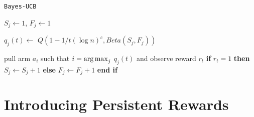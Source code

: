 \begin{algorithm}[H]
	\caption{\texttt{Bayes-UCB}}
	\begin{scriptsize}
		\begin{algorithmic}[1]						
			 
			\State $S_j \gets 1 $, $F_j \gets 1 $
			\EndFor
			 
			
			\State  $q_j(t) \gets$  $Q(1-{1}/{t(\log n)^c},Beta(S_j,F_j))$
			
			\EndFor
			\State pull arm $a_i$ such that  $i = \operatorname*{arg\,max}_j$ $q_j(t) $ and observe reward ${r_t}$	
			\State 	\textbf{if} $r_t=1$  \textbf{then} $S_j \gets S_j + 1$ \textbf{else}  $F_j \gets F_j + 1$  \textbf{end if}
			
			
			\EndFor	
		\end{algorithmic}
	\end{scriptsize}
	\label{a:BU}
\end{algorithm}


\section{Introducing Persistent Rewards}


